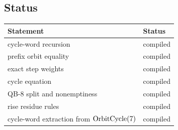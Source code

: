 \subsection{Status}

\begin{center}
\small
\begin{tabular}{@{}p{}p{}@{}}
\toprule
Statement & Status \\
\midrule
cycle-word recursion & compiled \\
prefix orbit equality & compiled \\
exact step weights & compiled \\
cycle equation & compiled \\
QB-8 split and nonemptiness & compiled \\
rise residue rules & compiled \\
cycle-word extraction from $\mathrm{OrbitCycle}(7)$ & compiled \\
\bottomrule
\end{tabular}
\end{center}
